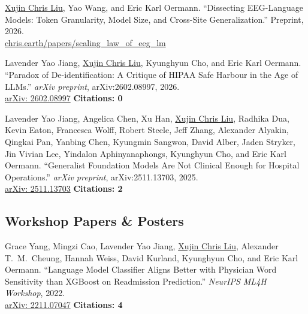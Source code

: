 \documentclass[11pt,a4paper]{article}
\begin{document}
\begin{enumerate}[leftmargin=*, label={[\arabic*]}, itemsep=6pt, resume]

  \item \underline{Xujin Chris Liu}, Yao Wang, and Eric Karl Oermann.
    ``Dissecting EEG-Language Models: Token Granularity, Model Size, and Cross-Site Generalization.''
    Preprint, 2026. \\
    \href{https://chris.earth/papers/scaling_law_of_eeg_lm/paper.pdf}{chris.earth/papers/scaling\_law\_of\_eeg\_lm}

  \item Lavender Yao Jiang, \underline{Xujin Chris Liu}, Kyunghyun Cho, and Eric Karl Oermann.
    ``Paradox of De-identification: A Critique of HIPAA Safe Harbour in the Age of LLMs.''
    \textit{arXiv preprint}, arXiv:2602.08997, 2026. \\
    \href{https://arxiv.org/abs/2602.08997}{arXiv: 2602.08997} \hfill \textbf{Citations: 0}

  \item Lavender Yao Jiang, Angelica Chen, Xu Han, \underline{Xujin Chris Liu}, Radhika Dua, Kevin Eaton, Francesca Wolff, Robert Steele, Jeff Zhang, Alexander Alyakin, Qingkai Pan, Yanbing Chen, Kyungmin Sangwon, David Alber, Jaden Stryker, Jin Vivian Lee, Yindalon Aphinyanaphongs, Kyunghyun Cho, and Eric Karl Oermann.
    ``Generalist Foundation Models Are Not Clinical Enough for Hospital Operations.''
    \textit{arXiv preprint}, arXiv:2511.13703, 2025. \\
    \href{https://arxiv.org/abs/2511.13703}{arXiv: 2511.13703} \hfill \textbf{Citations: 2}

\end{enumerate}

\subsection*{Workshop Papers \& Posters}

\begin{enumerate}[leftmargin=*, label={[\arabic*]}, itemsep=6pt, resume]

  \item Grace Yang, Mingzi Cao, Lavender Yao Jiang, \underline{Xujin Chris Liu}, Alexander T.\ M.\ Cheung, Hannah Weiss, David Kurland, Kyunghyun Cho, and Eric Karl Oermann.
    ``Language Model Classifier Aligns Better with Physician Word Sensitivity than XGBoost on Readmission Prediction.''
    \textit{NeurIPS ML4H Workshop}, 2022. \\
    \href{https://arxiv.org/abs/2211.07047}{arXiv: 2211.07047} \hfill \textbf{Citations: 4}

\end{enumerate}
\end{document}
